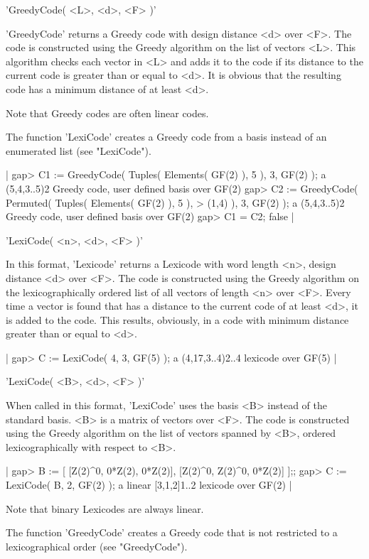 'GreedyCode( <L>, <d>, <F> )'

'GreedyCode' returns a Greedy code with design distance <d> over <F>. The
code is  constructed using the  Greedy algorithm  on the  list of vectors
<L>. This algorithm checks each vector in <L> and  adds it to the code if
its distance to the current  code is greater than  or equal to <d>. It is
obvious that the resulting code has a minimum distance of at least <d>.

Note that Greedy codes are often linear codes.

The function 'LexiCode' creates a Greedy code  from a basis instead of an
enumerated list (see "LexiCode").

|    gap> C1 := GreedyCode( Tuples( Elements( GF(2) ), 5 ), 3, GF(2) );
    a (5,4,3..5)2 Greedy code, user defined basis over GF(2)
    gap> C2 := GreedyCode( Permuted( Tuples( Elements( GF(2) ), 5 ),
    >                         (1,4) ), 3, GF(2) );
    a (5,4,3..5)2 Greedy code, user defined basis over GF(2)
    gap> C1 = C2;
    false |


'LexiCode( <n>, <d>, <F> )'

In this format, 'Lexicode'  returns  a Lexicode   with word length   <n>,
design distance <d>  over <F>. The code is  constructed using  the Greedy
algorithm on the lexicographically ordered  list of all vectors of length
<n> over <F>.   Every time a vector  is found that has  a distance to the
current code  of  at least <d>,  it is  added to the  code. This results,
obviously, in a code with minimum distance greater than or equal to <d>.

|    gap> C := LexiCode( 4, 3, GF(5) );
    a (4,17,3..4)2..4 lexicode over GF(5) |

'LexiCode( <B>, <d>, <F> )'

When called in this format, 'LexiCode' uses the  basis <B> instead of the
standard basis. <B>  is  a  matrix of vectors    over <F>.  The  code  is
constructed using the Greedy algorithm on the  list of vectors spanned by
<B>, ordered lexicographically with respect to <B>.

|    gap> B := [ [Z(2)^0, 0*Z(2), 0*Z(2)], [Z(2)^0, Z(2)^0, 0*Z(2)] ];;
    gap> C := LexiCode( B, 2, GF(2) );
    a linear [3,1,2]1..2 lexicode over GF(2) |

Note that binary Lexicodes are always linear.

The function 'GreedyCode' creates a Greedy code that is not restricted to
a lexicographical order (see "GreedyCode").

